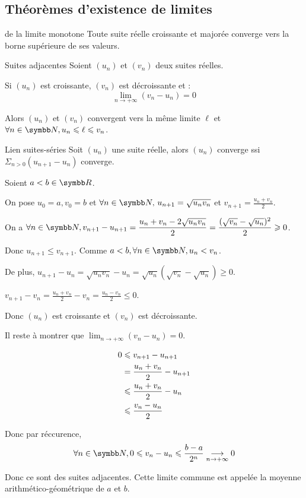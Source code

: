 \subsection{Théorèmes d'existence de limites}
\begin{theoreme}{de la limite monotone}{}
    Toute suite réelle croissante et majorée converge vers la borne supérieure de ses valeurs. 
\end{theoreme}

\begin{theoreme}{Suites adjacentes}{}
    Soient $(u_n)$ et $(v_n)$ deux suites réelles. 

    Si $(u_n)$ est croissante, $(v_n)$ est décroissante et :
    \[\lim_{n \to +\infty} (v_n - u_n) = 0\]

    Alors $(u_n)$ et $(v_n)$ convergent vers la même limite $\ell$ 
    et $\forall n \in \N, u_n \leqslant \ell \leqslant v_n$.
\end{theoreme}

\begin{theoreme}{Lien suites-séries}{}
    Soit $(u_n)$ une suite réelle, alors $(u_n)$ converge ssi $\Sigma_{n>0} (u_{n+1} - u_n)$ converge.
\end{theoreme}

\begin{exemple}
    Soient $a < b \in \R$.

    On pose $u_0 = a, v_0 = b$ 
    et $\forall n \in \N, \, u_{n+1} = \sqrt{u_n v_n}$ et $v_{n+1} = \frac{u_n + v_n} 2$.
 
    \svspace On a $\displaystyle \forall n \in \N, v_{n+1} - u_{n+1} = \frac{u_n + v_n -2 \sqrt{u_n v_n}} 2 = \frac{(\sqrt{v_n} - \sqrt{u_n})^2} 2 \geqslant 0$.

    Donc $u_{n + 1} \leqslant v_{n + 1}$.
    Comme $a < b, \forall n \in \N, u_n < v_n$.

    \avspace De plus, $u_{n + 1} - u_n = \sqrt{u_n v_n} - u_n = \sqrt{u_n}\left(\sqrt{v_n} - \sqrt{u_n}\right) \geqslant 0$.

    $v_{n + 1} - v_n = \frac{u_n + v_n} 2 - v_n = \frac{u_n - v_n} 2 \leqslant 0$.

    Donc $(u_n)$ est croissante et $(v_n)$ est décroissante.

    Il reste à montrer que $\lim_{n \to +\infty} (v_n - u_n) = 0$.

    \begin{align}
        0 & \leqslant  v_{n + 1} - u_{n + 1} \\
        \space & = \frac{u_n + v_n} 2 - u_{n + 1} \\
        \space &  \leqslant \frac{u_n + v_n} 2 - u_n \\
        \space & \leqslant \frac{v_n - u_n} 2 \\
    \end{align}
    
    Donc par réccurence, 
    \[\forall n \in \N, 0 \leqslant v_n - u_n \leqslant \frac{b - a}{2^n} \limit{n}{+ \infty} 0\]

    Donc ce sont des suites adjacentes.
    Cette limite commune est appelée la moyenne arithmético-géométrique de $a$ et $b$.
\end{exemple}

